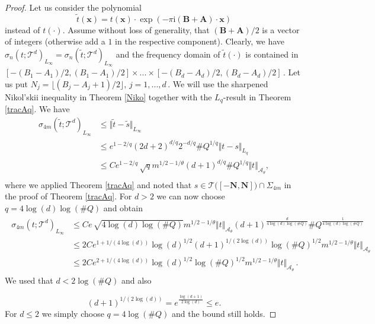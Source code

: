 \documentclass[11pt,reqno]{article}
\numberwithin{equation}{section}
\theoremstyle{definition}
\theoremstyle{plain}
\newcommand{\ca}{\ensuremath{\mathcal A}}
\newcommand{\bN}{\ensuremath{\mathbf N}}
\newcommand{\bx}{\ensuremath{\mathbf x}}
\begin{document}
\begin{proof} Let us consider the polynomial 
 $$
    \widetilde{t}(\bx) = t(\bx)\cdot \exp(-\pi \mathrm{i} (\mathbf{B}+\mathbf{A})\cdot \bx )
 $$
instead of $t(\cdot)$. Assume without loss of generality, that \({(\mathbf{B}+\mathbf{A})}/{2}\) is a vector of integers (otherwise add a $1$ in the respective component). Clearly, we have $\sigma_{n}(t;\mathcal{T}^d)_{L_\infty} = \sigma_{n}(\widetilde{t};\mathcal{T}^d)_{L_\infty}$ and the frequency domain of $\widetilde{t}(\cdot)$ is contained in $[-(B_1-A_1)/2,(B_1-A_1)/2]\times...\times [-(B_d-A_d)/2,(B_d-A_d)/2]$\,. Let us put $N_j = \lfloor (B_j-A_j+1)/2 \rfloor$, $j=1,...,d$\,. 
We will use the sharpened Nikol'skii inequality in Theorem \ref{Niko} together with the $L_q$-result in Theorem \ref{tracAq}.
We have
  \begin{align*}
    \sigma_{4m}(\widetilde{t};\mathcal{T}^d)_{L_\infty} & \leq \Vert \widetilde{t} - \widetilde s\Vert_{L_\infty} \\
    & \leq e^{1-2/q}  (2d+2)^{d/q} 2^{-d/q} {\# Q}^{1/q} \Vert t - s\Vert_{L_q}\\
    & \leq C e^{1-2/q} \, \sqrt{q} m^{1/2-1/\theta}  (d+1)^{d/q}{\# Q}^{1/q}\Vert t \Vert_{\ca_\theta}, \\
\end{align*}
 where we  applied Theorem \ref{tracAq} and noted that \(s \in \mathcal{T}\big([-\bN,\bN]\big)\cap \Sigma_{4m}\) in the proof of Theorem \ref{tracAq}. For \(d>2\) we can now choose \(q = 4 \log(d) \log({\# Q})\) and obtain
\begin{align} \label{qlarge}
\begin{split}
    \sigma_{4m}(t;\mathcal{T}^d)_{L_\infty} & \leq C e \, \sqrt{{4 \log(d) \log({\# Q})}} m^{1/2-1/\theta} \Vert t \Vert_{\ca_\theta}(d+1)^{\frac{d}{4 \log(d) \log({\# Q})}} {\# Q}^{\frac{1}{4 \log(d) \log({\# Q})}} \\
    & \leq 2 C e^{1+1/(4 \log(d))} \log(d)^{1/2} (d+1)^{1/({2\log(d)})} \log({\# Q})^{1/2} m^{1/2-1/\theta} \Vert t \Vert_{\ca_\theta} \\
    & \leq 2 C e^{2+1/(4\log(d))} \log(d)^{1/2} \log({\# Q})^{1/2} m^{1/2-1/\theta} \Vert t \Vert_{\ca_\theta}\,. 
\end{split}
\end{align} 
We used that \(d < 2\log({\# Q})\) and also 

\begin{equation} \label{est-d}
    (d+1)^{1/(2\log(d))} = e^{\frac{\log(d+1)}{2 \log(d)}}  \leq e.
\end{equation}
For \(d\leq 2\) we simply choose \(q = 4 \log({\# Q})\) and the bound still holds.
\end{proof}
\end{document}

